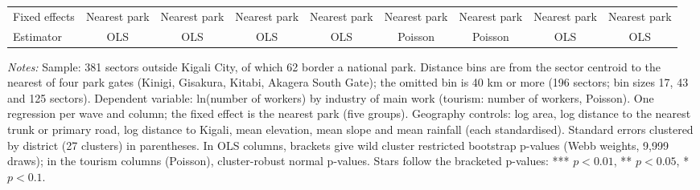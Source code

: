 \documentclass[11pt]{article}
\begin{document}
\begin{table}[H]
{\begin{tabular}{lcccccccc}
Fixed effects & Nearest park & Nearest park & Nearest park & Nearest park & Nearest park & Nearest park & Nearest park & Nearest park \\
Estimator & OLS & OLS & OLS & OLS & Poisson & Poisson & OLS & OLS \\
\bottomrule
\end{tabular}}
\begin{minipage}{0.97\textwidth}\scriptsize
\textit{Notes:} Sample: 381 sectors outside Kigali City, of which 62 border a national park. Distance bins are from the sector centroid to the nearest of four park gates (Kinigi, Gisakura, Kitabi, Akagera South Gate); the omitted bin is 40 km or more (196 sectors; bin sizes 17, 43 and 125 sectors). Dependent variable: ln(number of workers) by industry of main work (tourism: number of workers, Poisson). One regression per wave and column; the fixed effect is the nearest park (five groups). Geography controls: log area, log distance to the nearest trunk or primary road, log distance to Kigali, mean elevation, mean slope and mean rainfall (each standardised). Standard errors clustered by district (27 clusters) in parentheses. In OLS columns, brackets give wild cluster restricted bootstrap p-values (Webb weights, 9,999 draws); in the tourism columns (Poisson), cluster-robust normal p-values. Stars follow the bracketed p-values: *** $p<0.01$, ** $p<0.05$, * $p<0.1$.
\end{minipage}
\end{table}
\end{document}
